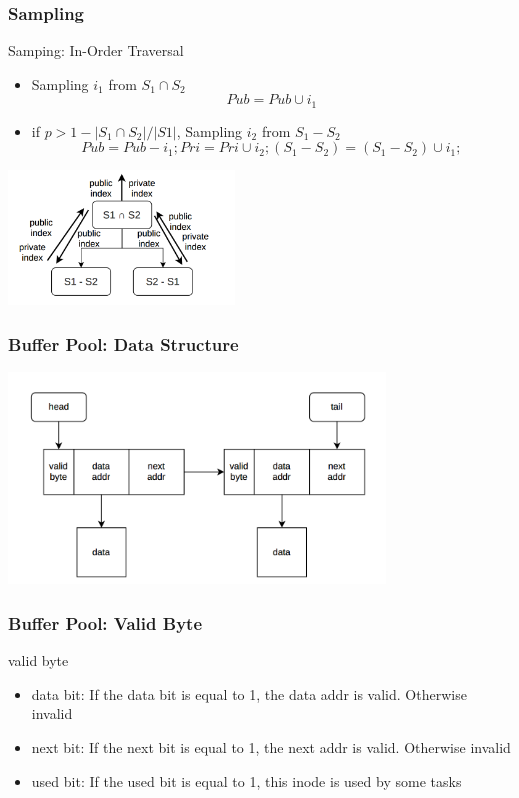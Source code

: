 \documentclass[notheorems, aspectratio=54]{beamer}
\begin{document}
\begin{frame}
    \frametitle{Sampling}
    \begin{block} {Samping: In-Order Traversal}
        \begin{itemize}
            \item Sampling $i_1$ from $S_1\cap S_2$
            $$Pub = Pub \cup {i_1}$$
            \item if $p > 1-|S_1\cap S_2|/|S1|$, Sampling $i_2$ from $S_1-S_2$
            $$Pub = Pub-{i_1}; Pri = Pri\cup{i_2}; (S_1-S_2)=(S_1-S_2)\cup{i_1};$$
        \end{itemize}
    \end{block}
    \centering
    \includegraphics[width=6cm]{global_img_dir/Sampling.png}
\end{frame}

\begin{frame}
    \frametitle{Buffer Pool: Data Structure}
    \centering
    \includegraphics[width=10cm]{global_img_dir/linklist.png}
\end{frame}

\begin{frame}
    \frametitle{Buffer Pool: Valid Byte}
    \begin{block} {valid byte}
        \begin{itemize}
            \item data bit: If the data bit is equal to 1, the data addr is valid. Otherwise invalid
            \item next bit: If the next bit is equal to 1, the next addr is valid. Otherwise invalid
            \item used bit: If the used bit is equal to 1, this inode is used by some tasks
        \end{itemize}
    \end{block}
\end{frame}
\end{document}
